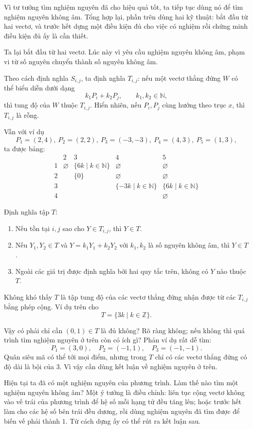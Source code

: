 \documentclass[11pt]{article}
\newcommand{\Z}{\mathbb{Z}}
\newcommand{\N}{\mathbb{N}}
\begin{document}
Vì tư tưởng tìm nghiệm nguyên đã cho hiệu quả tốt, ta tiếp tục dùng nó để tìm
nghiệm nguyên không âm. Tổng hợp lại, phần trên dùng hai kỹ thuật: bắt đầu từ
hai vectơ, và trước hết dựng một điều kiện đủ cho việc có nghiệm rồi chứng
minh điều kiện đủ ấy là cần thiết.

Ta lại bắt đầu từ hai vectơ. Lúc này vì yêu cầu nghiệm nguyên không âm, phạm
vi từ số nguyên chuyển thành số nguyên không âm.

Theo cách định nghĩa \(S_{i,j}\), ta định nghĩa \(T_{i,j}\): nếu một vectơ
thẳng đứng \(W\) có thể biểu diễn dưới dạng
\[
  k_1P_i+k_2P_j,\qquad k_1,k_2\in\N,
\]
thì tung độ của \(W\) thuộc \(T_{i,j}\). Hiển nhiên, nếu \(P_i,P_j\) cùng
hướng theo trục \(x\), thì \(T_{i,j}\) là rỗng.

Vẫn với ví dụ
\[
P_1=(2,4),\ P_2=(2,2),\ P_3=(-3,-3),\ P_4=(4,3),\ P_5=(1,3),
\]
ta được bảng:
\[
\begin{array}{c|cccc}
 &2&3&4&5\\ \hline
1&\varnothing&\{6k\mid k\in\N\}&\varnothing&\varnothing\\
2&&\{0\}&\varnothing&\varnothing\\
3&&&\{-3k\mid k\in\N\}&\{6k\mid k\in\N\}\\
4&&&&\varnothing
\end{array}
\]

Định nghĩa tập \(T\):
\begin{enumerate}
  \item Nếu tồn tại \(i,j\) sao cho \(Y\in T_{i,j}\), thì \(Y\in T\).
  \item Nếu \(Y_1,Y_2\in T\) và \(Y=k_1Y_1+k_2Y_2\) với \(k_1,k_2\) là số
  nguyên không âm, thì \(Y\in T\).
  \item Ngoài các giá trị được định nghĩa bởi hai quy tắc trên, không có
  \(Y\) nào thuộc \(T\).
\end{enumerate}
Không khó thấy \(T\) là tập tung độ của các vectơ thẳng đứng nhận được từ
các \(T_{i,j}\) bằng phép cộng. Ví dụ trên cho
\[
  T=\{3k\mid k\in\Z\}.
\]

Vậy có phải chỉ cần \((0,1)\in T\) là đủ không? Rõ ràng không; nếu không thì
quá trình tìm nghiệm nguyên ở trên còn có ích gì? Phản ví dụ rất dễ tìm:
\[
  P_1=(3,0),\quad P_2=(-1,1),\quad P_3=(-1,-1).
\]
Quân siêu mã có thể tới mọi điểm, nhưng trong \(T\) chỉ có các vectơ thẳng
đứng có độ dài là bội của \(3\). Vì vậy cần dùng kết luận về nghiệm nguyên ở
trên.

Hiện tại ta đã có một nghiệm nguyên của phương trình. Làm thế nào tìm một
nghiệm nguyên không âm? Một ý tưởng là điều chỉnh: liên tục cộng vectơ không
vào vế trái của phương trình để hệ số mỗi hạng tử đều tăng lên; hoặc trước
hết làm cho các hệ số bên trái đều dương, rồi dùng nghiệm nguyên đã tìm được
để biến vế phải thành \(1\). Từ cách dựng ấy có thể rút ra kết luận sau.
\end{document}
